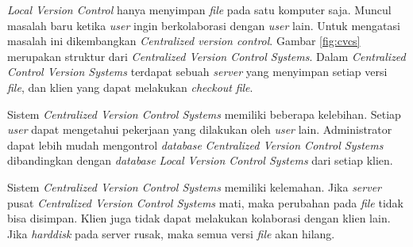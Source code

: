 \textit{Local Version Control} hanya menyimpan \textit{file} pada satu komputer saja. Muncul masalah baru ketika \textit{user} ingin berkolaborasi dengan \textit{user} lain. Untuk mengatasi masalah ini dikembangkan \textit{Centralized version control}. Gambar \ref{fig:cvcs} merupakan struktur dari \textit{Centralized Version Control Systems}. Dalam \textit{Centralized Control Version Systems} terdapat sebuah \textit{server} yang menyimpan setiap versi \textit{file}, dan klien yang dapat melakukan \textit{checkout} \textit{file}.

Sistem \textit{Centralized Version Control Systems} memiliki beberapa kelebihan. Setiap \textit{user}  dapat mengetahui pekerjaan yang dilakukan oleh \textit{user} lain. Administrator dapat lebih mudah mengontrol \textit{database} \textit{Centralized Version Control Systems} dibandingkan dengan \textit{database} \textit{Local Version Control Systems} dari setiap klien.      

Sistem \textit{Centralized Version Control Systems} memiliki kelemahan. Jika \textit{server} pusat \textit{Centralized Version Control Systems} mati, maka perubahan pada \textit{file} tidak bisa disimpan. Klien juga tidak dapat melakukan kolaborasi dengan klien lain. Jika \textit{harddisk} pada server rusak, maka semua versi \textit{file} akan hilang.  

